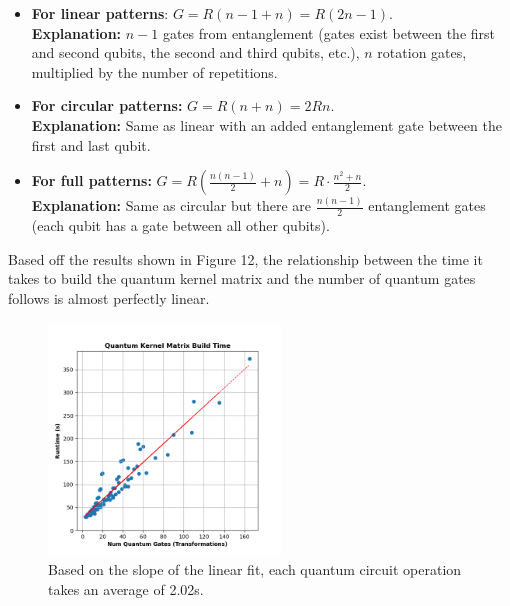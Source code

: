 \documentclass[11pt, oneside]{article}   	%
\begin{document}
\begin{itemize}
	\item \textbf{For linear patterns}: $G=R(n-1 + n) = R(2n-1)$. \\ \textbf{Explanation:} $n-1$ gates from entanglement (gates exist between the first and second qubits, the second and third qubits, etc.), $n$ rotation gates, multiplied by the number of repetitions.
	\item \textbf{For circular patterns:} $G=R(n + n) = 2Rn$. \\ \textbf{Explanation:} Same as linear with an added entanglement gate between the first and last qubit.
	\item \textbf{For full patterns:} $G=R(\frac{n(n-1)}{2} + n) = R\cdot \frac{n^2+n}{2}$. \\ \textbf{Explanation:} Same as circular but there are $\frac{n(n-1)}{2}$ entanglement gates (each qubit has a gate between all other qubits). 
\end{itemize}

Based off the results shown in Figure 12, the relationship between the time it takes to build the quantum kernel matrix and the number of quantum gates follows is almost perfectly linear. 

\begin{figure}[h!]
	\centering
	\includegraphics[width=0.55\textwidth]{figures/fig_12.png}
	\captionsetup{font=small} 
	\caption{Based on the slope of the linear fit, each quantum circuit operation takes an average of 2.02s.}
	\label{fig12}
\end{figure}


\end{document}

